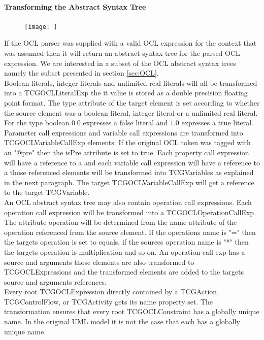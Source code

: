 \paragraph{Transforming the Abstract Syntax Tree}
\begin{figure}
\texttt{[image: ]}
\end{figure}
If the OCL parser was supplied with a valid OCL expression for the context that was assumed then it will return an abstract syntax tree for the parsed OCL expression. We are interested in a subset of the OCL abstract syntax trees namely the subset presented in section \ref{sec:OCL}. \\
Boolean literals, integer literals and unlimited real literals will all be transformed into a TCGOCLLiteralExp the it value is stored as a double precision floating point format. The type attribute of the target element is set according to whether the source element was a boolean literal, integer literal or a unlimited real literal. For the type boolean $0.0$ expresses a false literal and $1.0$ expresses a true literal.\\
Parameter call expressions and variable call expressions are transformed into TCGOCLVariableCallExp elements. If the original OCL token was tagged with an "@pre" then the isPre attribute is set to true. Each property call expression will have a reference to a  and each variable call expression will have a reference to a  those referenced elements will be transformed into TCGVariables as explained in the next paragraph. The target TCGOCLVariableCallExp will get a reference to the target TCGVariable.\\
An OCL abstract syntax tree may also contain operation call expressions. Each operation call expression will be transformed into a TCGOCLOperationCallExp. The attribute operation will be determined from the name attribute of the operation referenced from the source element. If the operations name is "=" then the targets operation is set to equals, if the sources operation name is "*" then the targets operation is multiplication and so on. An operation call exp has a source and arguments those elements are also transformed to TCGOCLExpressions and the transformed elements are added to the targets source and arguments references.\\
Every root TCGOCLExpression directly contained by a TCGAction, TCGControlFlow, or TCGActivity gets its name property set. The transformation ensures that every root TCGOCLConstraint has a globally unique name. In the original UML model it is not the case that each  has a globally unique name.

